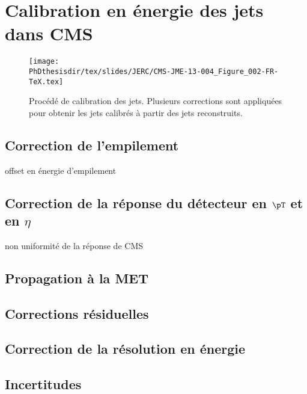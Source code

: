 \section{Calibration en énergie des jets dans CMS}

\begin{figure}[h]
\centering
\texttt{[image: \\PhDthesisdir/tex/slides/JERC/CMS-JME-13-004\_Figure\_002-FR-TeX.tex]}
\caption{Procédé de calibration des jets. Plusieurs corrections sont appliquées pour obtenir les jets calibrés à partir des jets reconstruits.}
\label{fig-CMS-JME-13-004_Figure_002-FR-TeX}
\end{figure}

\subsection{Correction de l'empilement}
offset en énergie d'empilement

\subsection{Correction de la réponse du détecteur en $\pT$ et en $\eta$}
non uniformité de la réponse de CMS

\subsection{Propagation à la MET}

\subsection{Corrections résiduelles}

\subsection{Correction de la résolution en énergie}

\subsection{Incertitudes}